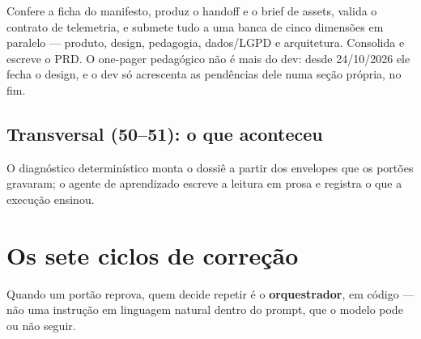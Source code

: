 \documentclass[11pt,a4paper]{article}
\begin{document}
Confere a ficha do manifesto, produz o handoff e o brief de assets, valida o contrato de
telemetria, e submete tudo a uma banca de cinco dimensões em paralelo --- produto, design,
pedagogia, dados/LGPD e arquitetura. Consolida e escreve o PRD. O one-pager pedagógico não é
mais do dev: desde 24/10/2026 ele fecha o design, e o dev só acrescenta as pendências dele numa
seção própria, no fim.

\subsection{Transversal (50--51): o que aconteceu}

O diagnóstico determinístico monta o dossiê a partir dos envelopes que os portões gravaram; o
agente de aprendizado escreve a leitura em prosa e registra o que a execução ensinou.

\section{Os sete ciclos de correção}

Quando um portão reprova, quem decide repetir é o \textbf{orquestrador}, em código --- não uma
instrução em linguagem natural dentro do prompt, que o modelo pode ou não seguir.

\begin{center}
\end{center}
\end{document}
